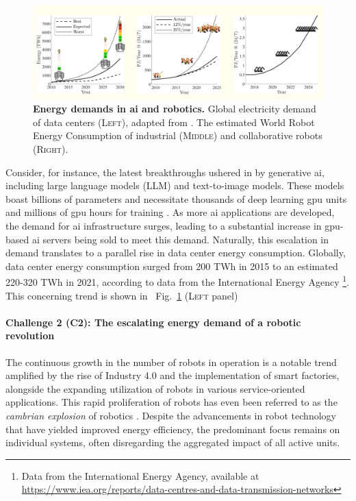 \documentclass[12pt]{article}
\begin{document}
\begin{figure}[t!]
	\centering
	\hspace*{\fill}
	\includegraphics[width=\textwidth]{energy_consumption_trends_ai_and_robotics.png}
	\hspace*{\fill}
	\caption[] {\label{fig:energy_consumption_trends_ai_and_robotics} \textbf{Energy demands in \ac{ai} and robotics.} Global electricity demand of data centers (\textsc{Left}), adapted from \cite{andrae2015global}. The estimated World Robot Energy Consumption of industrial (\textsc{Middle}) and  collaborative robots (\textsc{Right}).}
\end{figure}



Consider, for instance, the latest breakthroughs ushered in by generative \ac{ai}, including large language models (LLM) and text-to-image models. These models boast billions of parameters and necessitate thousands of deep learning \ac{gpu} units and millions of \ac{gpu} hours for training \cite{Vanian2023ChatGPTgenerativeAI, Corbyn2023Nvidiachipmaker}. As more \ac{ai} applications are developed, the demand for \ac{ai} infrastructure surges, leading to a substantial increase in \ac{gpu}-based \ac{ai} servers being sold to meet this demand. Naturally, this escalation in demand translates to a parallel rise in data center energy consumption. Globally, data center energy consumption surged from 200 TWh in 2015 to an estimated 220-320 TWh in 2021, according to data from the International Energy Agency \footnote{Data from the International Energy Agency, available at \url{https://www.iea.org/reports/data-centres-and-data-transmission-networks}}. This concerning trend is shown in~%
Fig.~\ref{fig:energy_consumption_trends_ai_and_robotics} (\textsc{Left} panel)

\paragraph*{\textbf{Challenge 2} (C2): The escalating energy demand of a robotic revolution}\label{sec:robots_challenge}
The continuous growth in the number of robots in operation is a notable trend amplified by the rise of Industry 4.0 and the implementation of smart factories, alongside the expanding utilization of robots in various service-oriented applications. This rapid proliferation of robots has even been referred to as the \textit{cambrian explosion} of robotics \cite{Pratt2015Iscambrianexplosion}. Despite the advancements in robot technology that have yielded improved energy efficiency, the predominant focus remains on individual systems, often disregarding the aggregated impact of all active units.
\end{document}
